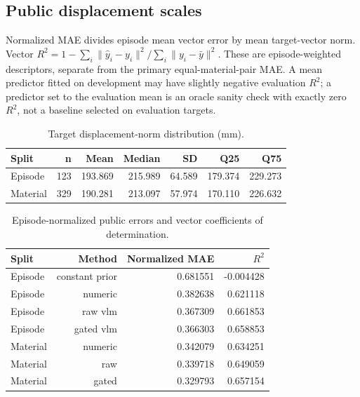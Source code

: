 \subsection{Public displacement scales}
Normalized MAE divides episode mean vector error by mean target-vector norm. Vector $R^2=1-\sum_i\|\hat y_i-y_i\|^2/\sum_i\|y_i-\bar y\|^2$. These are episode-weighted descriptors, separate from the primary equal-material-pair MAE. A mean predictor fitted on development may have slightly negative evaluation $R^2$; a predictor set to the evaluation mean is an oracle sanity check with exactly zero $R^2$, not a baseline selected on evaluation targets.
\begin{table}[htbp]\centering\small
\caption{Target displacement-norm distribution (mm).}\label{tab:ext_scale}
\begin{tabular}{lrrrrrr}\toprule
Split & n & Mean & Median & SD & Q25 & Q75\\\midrule
Episode & 123 & 193.869 & 215.989 & 64.589 & 179.374 & 229.273\\
Material & 329 & 190.281 & 213.097 & 57.974 & 170.110 & 226.632\\
\bottomrule\end{tabular}
\end{table}
\begin{table}[htbp]\centering\small
\caption{Episode-normalized public errors and vector coefficients of determination.}\label{tab:ext_r2}
\begin{tabular}{lrrr}\toprule
Split & Method & Normalized MAE & $R^2$\\\midrule
Episode & constant prior & 0.681551 & -0.004428\\
Episode & numeric & 0.382638 & 0.621118\\
Episode & raw vlm & 0.367309 & 0.661853\\
Episode & gated vlm & 0.366303 & 0.658853\\
Material & numeric & 0.342079 & 0.634251\\
Material & raw & 0.339718 & 0.649059\\
Material & gated & 0.329793 & 0.657154\\
\bottomrule\end{tabular}
\end{table}
